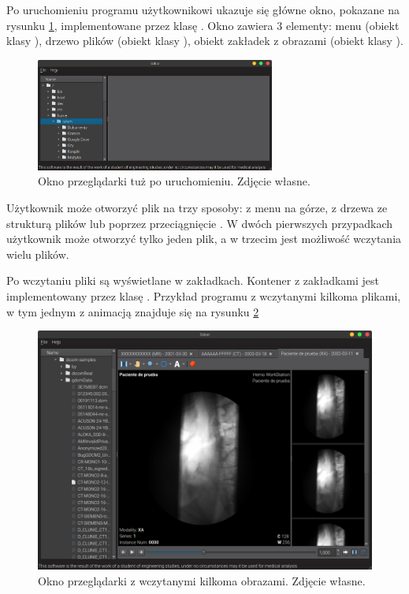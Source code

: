 \label{sec:sokar-gui}

\par
Po uruchomieniu programu użytkownikowi ukazuje się główne okno, pokazane na rysunku \ref{fig:sokar-gui-empty-window}, implementowane przez klasę .
Okno zawiera 3 elementy: menu (obiekt klasy ), drzewo plików (obiekt klasy ), obiekt zakładek z obrazami (obiekt klasy ).

\begin{figure}[!htbp]
    \centering
    \includegraphics[width=0.7\textwidth]{img/sokar-gui-001.png}
    \caption{Okno przeglądarki tuż po uruchomieniu. Zdjęcie własne.}
    \label{fig:sokar-gui-empty-window}
\end{figure}

\par
Użytkownik może otworzyć plik \DICOM na trzy sposoby: z menu na górze, z drzewa ze strukturą plików lub poprzez przeciągnięcie .
W dwóch pierwszych przypadkach użytkownik może otworzyć tylko jeden plik, a w trzecim jest możliwość wczytania wielu plików.

\par
Po wczytaniu pliki są wyświetlane w zakładkach.
Kontener z zakładkami jest implementowany przez klasę .
Przykład programu z wczytanymi kilkoma plikami, w tym jednym z animacją znajduje się na rysunku \ref{fig:sokar-gui-with-files}

\begin{figure}[!htbp]
    \centering
    \includegraphics[width=\textwidth]{img/sokar-gui-002.png}
    \caption{Okno przeglądarki z wczytanymi kilkoma obrazami. Zdjęcie własne.}
    \label{fig:sokar-gui-with-files}
\end{figure}

